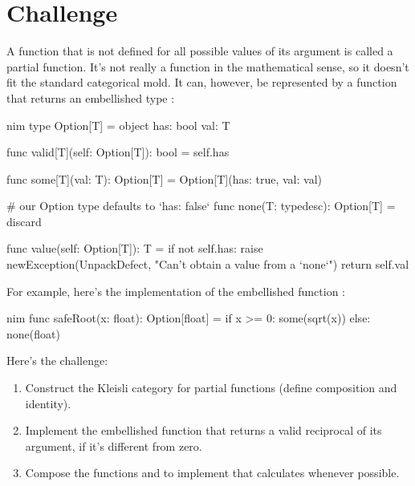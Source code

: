 \section{Challenge}

A function that is not defined for all possible values of its argument
is called a partial function. It's not really a function in the
mathematical sense, so it doesn't fit the standard categorical mold. It
can, however, be represented by a function that returns an embellished
type :

\begin{snip}{nim}
type Option[T] = object
  has: bool
  val: T

func valid[T](self: Option[T]): bool = self.has

func some[T](val: T): Option[T] = Option[T](has: true, val: val)

# our Option type defaults to `has: false`
func none(T: typedesc): Option[T] = discard

func value(self: Option[T]): T =
  if not self.has:
    raise newException(UnpackDefect, "Can't obtain a value from a `none`")
  return self.val
\end{snip}
For example, here's the implementation of the embellished function
:

\begin{snip}{nim}
func safeRoot(x: float): Option[float] =
  if x >= 0:
    some(sqrt(x))
  else:
    none(float)
\end{snip}
Here's the challenge:

\begin{enumerate}
  \tightlist
  \item
        Construct the Kleisli category for partial functions (define
        composition and identity).
  \item
        Implement the embellished function  that
        returns a valid reciprocal of its argument, if it's different from
        zero.
  \item
        Compose the functions  and  to implement
         that calculates 
        whenever possible.
\end{enumerate}
